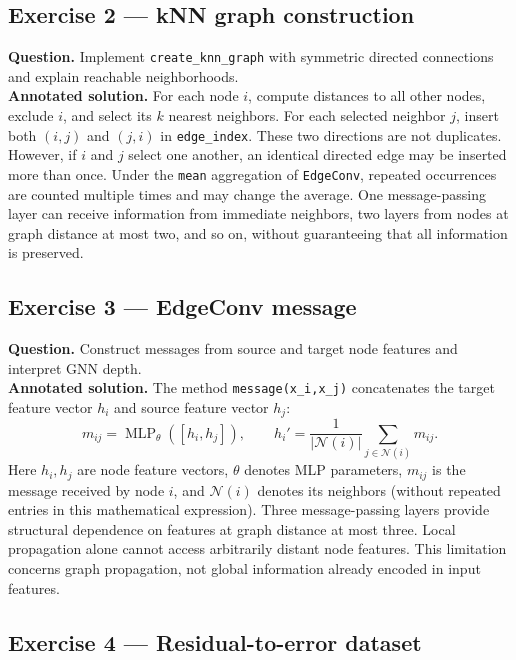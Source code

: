 \documentclass[11pt,a4paper]{article}
\begin{document}
\subsection{Exercise 2 --- kNN graph construction}

\noindent \textbf{Question.} Implement \texttt{create\_knn\_graph} with
symmetric directed connections and explain reachable neighborhoods.
\\

\noindent \textbf{Annotated solution.} For each node $i$, compute distances
to all other nodes, exclude $i$, and select its $k$ nearest
neighbors. For each selected neighbor $j$, insert both
$(i,j)$ and $(j,i)$ in \texttt{edge\_index}.
These two directions are not duplicates. However, if $i$
and $j$ select one another, an identical directed edge
may be inserted more than once. Under the \texttt{mean}
aggregation of \texttt{EdgeConv}, repeated occurrences
are counted multiple times and may change the average.
One message-passing layer can receive information from
immediate neighbors, two layers from nodes at graph
distance at most two, and so on, without guaranteeing
that all information is preserved.

\subsection{Exercise 3 --- EdgeConv message}

\noindent \textbf{Question.} Construct messages from source and target
node features and interpret GNN depth.
\\

\noindent \textbf{Annotated solution.} The method \texttt{message(x\_i,x\_j)}
concatenates the target feature vector $h_i$ and source
feature vector $h_j$:
\[
m_{ij}=\operatorname{MLP}_{\theta}([h_i,h_j]),\qquad
h_i'=\frac{1}{|\mathcal N(i)|}\sum_{j\in\mathcal N(i)}m_{ij}.
\]
Here $h_i,h_j$ are node feature vectors, $\theta$ denotes
MLP parameters, $m_{ij}$ is the message received by node $i$,
and $\mathcal N(i)$ denotes its neighbors (without repeated
entries in this mathematical expression). Three
message-passing layers provide structural dependence on
features at graph distance at most three. Local propagation
alone cannot access arbitrarily distant node features.
This limitation concerns graph propagation, not global
information already encoded in input features.

\subsection{Exercise 4 --- Residual-to-error dataset}
\end{document}
